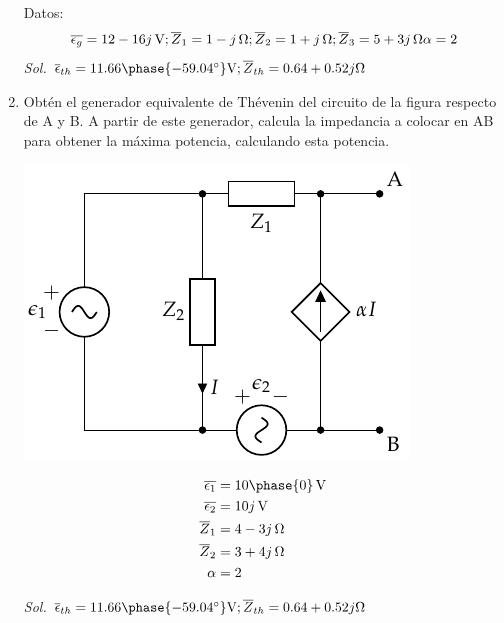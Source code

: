\begin{enumerate}
Datos:
\begin{equation*}
  \overline{\epsilon_g} = \qty[parse-numbers=false]{12 - 16j}{\volt};
  \overline{Z}_1 = \qty[parse-numbers=false]{1 - j}{\ohm};
  \overline{Z}_2 = \qty[parse-numbers=false]{1 + j}{\ohm};
  \overline{Z}_3 = \qty[parse-numbers=false]{5 + 3j}{\ohm}
  \alpha = 2
\end{equation*}
\emph{Sol.
  $ \overline{\epsilon}_{th} = 11.66\phase{\ang{-59.04}}\si{\volt};
  \overline{Z}_{th} = 0.64 + 0.52j\si{\ohm}$}

\item Obtén el generador equivalente de Thévenin del circuito de la figura respecto de A y B. A partir de este generador, calcula la impedancia a colocar en AB para obtener la máxima potencia, calculando esta potencia.

\begin{minipage}{0.5\textwidth}
\begin{center}
\includegraphics{../figs/Thevenin5}
\end{center}
\end{minipage}
\begin{minipage}{0.5\textwidth}
  \begin{align*}
    \overline{\epsilon_1} &= \SI[parse-numbers=false]{10\phase{0}}{\volt}\\
    \overline{\epsilon_2} &= \SI[parse-numbers=false]{10j}{\volt}\\
    \overline{Z}_1 &= \SI[parse-numbers=false]{4 - 3j}{\ohm}\\
    \overline{Z}_2 &= \SI[parse-numbers=false]{3 + 4j}{\ohm}\\
    \alpha &= 2
  \end{align*}
\end{minipage}

\emph{Sol. $
  \overline{\epsilon}_{th} = 11.66\phase{\ang{-59.04}}\si{\volt};
  \overline{Z}_{th} = 0.64 + 0.52j\si{\ohm}
  $}

\end{enumerate}
